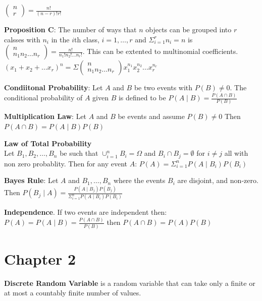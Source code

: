 \documentclass{article}
\begin{document}
\begin{multicols*}{2}
    $\begin{pmatrix}
            n \\
            r
        \end{pmatrix} = \frac{n!}{\left(n-r\right)! r!}$

    \textbf{Proposition C}: The number of ways that $n$ objects can be grouped into $r$ calsses with $n_i$ in the $i$th class,
    $i=1, \dots, r$ and $\Sigma^r_{i=1}n_i = n$ is
    $\begin{pmatrix}
            n \\
            n_1 n_2 \dots n_r
        \end{pmatrix} = \frac{n!}{n_1! n_2! \dots n_r!}$. This can be extented to multinomial coefficients.
    $\left(x_1 + x_2 + \dots x_r\right) ^ n = \Sigma \begin{pmatrix}
            n \\
            n_1 n_2 \dots n_r
        \end{pmatrix} x_1^{n_1}x_2^{n_2}\dots x_r^{n_r}$

    \textbf{Condiitonal Probability}: Let $A$ and $B$ be two events with $P\left( B \right) \neq 0$.
    The conditional probability of $A$ given $B$ is defined to be $P \left( A \mid B \right) = \frac{P \left( A \cap B \right)}{P \left( B \right)}$

    \textbf{Multiplication Law}: Let $A$ and $B$ be events and assume $P\left( B \right) \neq 0$ Then $P \left( A \cap B \right) = P \left( A \mid B \right) P \left( B \right)$

    \textbf{Law of Total Probability}\\
    Let $B_1, B_2, \dots, B_n$ be such that $\cup^n_{i=1}B_i = \Omega$
    and $B_i \cap B_j = \emptyset$ for $i \neq j$ all with non zero probablity.
    Then for any event $A$: $P \left( A \right) = \Sigma^n_{i=1} P\left( A \mid B_i\right) P \left( B_i\right)$

    \textbf{Bayes Rule}: Let $A$ and $B_1, \dots, B_n$ where the events $B_i$ are disjoint, and non-zero. Then
    $P\left(B_j \mid A \right) = \frac{P \left( A \mid B_j \right) P\left( B_j \right)}{\Sigma^n_{i=1}P \left( A \mid B_i\right) P \left(B_i\right)}$

    \textbf{Independence}. If two events are independent then: $P\left( A \right) = P \left( A \mid B \right) = \frac{P \left( A \cap B\right)}{P \left( B \right)}$ then $P\left( A \cap B \right) = P \left( A \right) P \left( B \right)$

    \section{Chapter 2}
    \textbf{Discrete Random Variable} is a random variable that can take only a finite or at most a countably finite number of values.


\end{multicols*}
\end{document}
